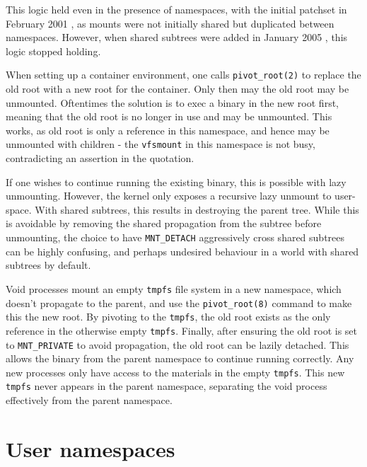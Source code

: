\documentclass[12pt,a4paper,twoside]{report}
\begin{document}

This logic held even in the presence of namespaces, with the initial patchset in February 2001 \citep{viro_patchcft_2001}, as mounts were not initially shared but duplicated between namespaces. However, when shared subtrees were added in January 2005 \citep{viro_rfc_2005}, this logic stopped holding.

When setting up a container environment, one calls \texttt{pivot\_root(2)} to replace the old root with a new root for the container. Only then may the old root may be unmounted. Oftentimes the solution is to exec a binary in the new root first, meaning that the old root is no longer in use and may be unmounted. This works, as old root is only a reference in this namespace, and hence may be unmounted with children - the \texttt{vfsmount} in this namespace is not busy, contradicting an assertion in the quotation.

If one wishes to continue running the existing binary, this is possible with lazy unmounting. However, the kernel only exposes a recursive lazy unmount to user-space. With shared subtrees, this results in destroying the parent tree. While this is avoidable by removing the shared propagation from the subtree before unmounting, the choice to have \texttt{MNT\_DETACH} aggressively cross shared subtrees can be highly confusing, and perhaps undesired behaviour in a world with shared subtrees by default.

Void processes mount an empty \texttt{tmpfs} file system in a new namespace, which doesn't propagate to the parent, and use the \texttt{pivot\_root(8)} command to make this the new root. By pivoting to the \texttt{tmpfs}, the old root exists as the only reference in the otherwise empty \texttt{tmpfs}. Finally, after ensuring the old root is set to \texttt{MNT\_PRIVATE} to avoid propagation, the old root can be lazily detached. This allows the binary from the parent namespace to continue running correctly. Any new processes only have access to the materials in the empty \texttt{tmpfs}. This new \texttt{tmpfs} never appears in the parent namespace, separating the void process effectively from the parent namespace.

\section{User namespaces}
\label{sec:voiding-user}
\end{document}
